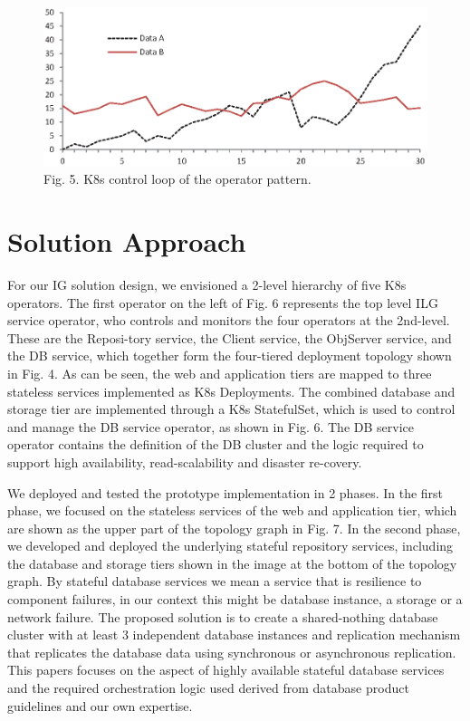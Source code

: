 \documentclass[runningheads]{llncs}
\begin{document}
\begin{figure}
\includegraphics[width=\textwidth]{fig1.eps}
\caption{Fig. 5. K8s control loop of the operator pattern.} \label{fig5}
\end{figure}

\section{Solution Approach}
For our IG solution design, we envisioned a 2-level hierarchy of five K8s operators. The first operator on the left of Fig. 6 represents the top level ILG service operator, who controls and monitors the four operators at the 2nd-level. These are the Reposi-tory service, the Client service, the ObjServer service, and the DB service, which together form the four-tiered deployment topology shown in Fig. 4. As can be seen, the web and application tiers are mapped to three stateless services implemented as K8s Deployments. The combined database and storage tier are implemented through a K8s StatefulSet, which is used to control and manage the DB service operator, as shown in Fig. 6. The DB service operator contains the definition of the DB cluster and the logic required to support high availability, read-scalability and disaster re-covery. 

We deployed and tested the prototype implementation in 2 phases. In the first phase, we focused on the stateless services of the web and application tier, which are shown as the upper part of the topology graph in Fig. 7. In the second phase, we developed and deployed the underlying stateful repository services, including the database and storage tiers shown in the image at the bottom of the topology graph. By stateful database services we mean a service that is resilience to component failures, in our context this might be database instance, a storage or a network failure. The proposed solution is to create a shared-nothing database cluster with at least 3 independent database instances and replication mechanism that replicates the database data using synchronous or asynchronous replication.
This papers focuses on the aspect of highly available stateful database services and the required orchestration logic used derived from database product guidelines and our own expertise.
\end{document}
